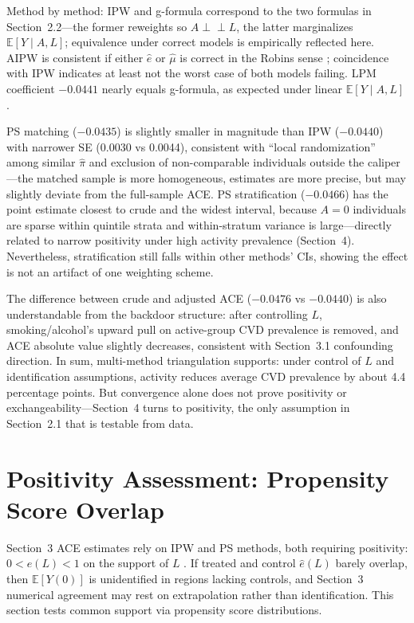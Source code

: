 \documentclass[12pt,a4paper]{article}
\newcommand{\E}{\mathbb{E}}
\newcommand{\indep}{\perp\!\!\!\perp}
\begin{document}
Method by method: IPW and g-formula correspond to the two formulas in Section~2.2---the former reweights so $A\indep L$, the latter marginalizes $\E[Y\mid A,L]$; equivalence under correct models is empirically reflected here. AIPW is consistent if either $\hat e$ or $\hat\mu$ is correct in the Robins sense \cite{robins1994estimation}; coincidence with IPW indicates at least not the worst case of both models failing. LPM coefficient $-0.0441$ nearly equals g-formula, as expected under linear $\E[Y\mid A,L]$ \cite{hernan2024whatif}.

PS matching ($-0.0435$) is slightly smaller in magnitude than IPW ($-0.0440$) with narrower SE (0.0030 vs 0.0044), consistent with ``local randomization'' among similar $\hat\pi$ and exclusion of non-comparable individuals outside the caliper---the matched sample is more homogeneous, estimates are more precise, but may slightly deviate from the full-sample ACE. PS stratification ($-0.0466$) has the point estimate closest to crude and the widest interval, because $A=0$ individuals are sparse within quintile strata and within-stratum variance is large---directly related to narrow positivity under high activity prevalence (Section~4). Nevertheless, stratification still falls within other methods' CIs, showing the effect is not an artifact of one weighting scheme.

The difference between crude and adjusted ACE ($-0.0476$ vs $-0.0440$) is also understandable from the backdoor structure: after controlling $L$, smoking/alcohol's upward pull on active-group CVD prevalence is removed, and ACE absolute value slightly decreases, consistent with Section~3.1 confounding direction. In sum, multi-method triangulation supports: under control of $L$ and identification assumptions, activity reduces average CVD prevalence by about 4.4 percentage points. But convergence alone does not prove positivity or exchangeability---Section~4 turns to positivity, the only assumption in Section~2.1 that is testable from data.

\section{Positivity Assessment: Propensity Score Overlap}

Section~3 ACE estimates rely on IPW and PS methods, both requiring positivity: $0<e(L)<1$ on the support of $L$ \cite{hernan2024whatif,chen2024iptw}. If treated and control $\hat e(L)$ barely overlap, then $\E[Y(0)]$ is unidentified in regions lacking controls, and Section~3 numerical agreement may rest on extrapolation rather than identification. This section tests common support via propensity score distributions.
\end{document}
